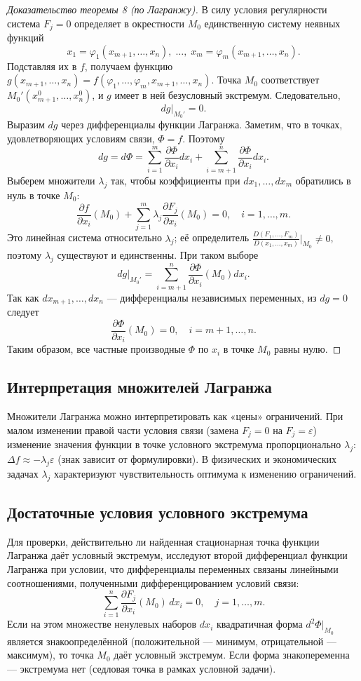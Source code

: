 \documentclass{article}
\theoremstyle{definition}
\begin{document}
\begin{proof}[Доказательство теоремы 8 (по Лагранжу)]
В силу условия регулярности система $F_j=0$ определяет в окрестности $M_0$ единственную систему неявных функций
\[
x_1=\varphi_1(x_{m+1},\dots,x_n),\;\dots,\;x_m=\varphi_m(x_{m+1},\dots,x_n).
\]
Подставляя их в $f$, получаем функцию $g(x_{m+1},\dots,x_n)=f(\varphi_1,\dots,\varphi_m,x_{m+1},\dots,x_n)$. Точка $M_0$ соответствует $M_0'(x_{m+1}^0,\dots,x_n^0)$, и $g$ имеет в ней безусловный экстремум. Следовательно,
\[
dg|_{M_0'}=0.
\]
Выразим $dg$ через дифференциалы функции Лагранжа. Заметим, что в точках, удовлетворяющих условиям связи, $\Phi=f$. Поэтому
\[
dg = d\Phi = \sum_{i=1}^m\frac{\partial\Phi}{\partial x_i}dx_i+\sum_{i=m+1}^n\frac{\partial\Phi}{\partial x_i}dx_i.
\]
Выберем множители $\lambda_j$ так, чтобы коэффициенты при $dx_1,\dots,dx_m$ обратились в нуль в точке $M_0$:
\[
\frac{\partial f}{\partial x_i}(M_0)+\sum_{j=1}^m\lambda_j\frac{\partial F_j}{\partial x_i}(M_0)=0,\quad i=1,\dots,m.
\]
Это линейная система относительно $\lambda_j$; её определитель $\frac{D(F_1,\dots,F_m)}{D(x_1,\dots,x_m)}\big|_{M_0}\neq0$, поэтому $\lambda_j$ существуют и единственны. При таком выборе
\[
dg|_{M_0'}= \sum_{i=m+1}^n\frac{\partial\Phi}{\partial x_i}(M_0)dx_i.
\]
Так как $dx_{m+1},\dots,dx_n$ — дифференциалы независимых переменных, из $dg=0$ следует
\[
\frac{\partial\Phi}{\partial x_i}(M_0)=0,\quad i=m+1,\dots,n.
\]
Таким образом, все частные производные $\Phi$ по $x_i$ в точке $M_0$ равны нулю.
\end{proof}

\subsection{Интерпретация множителей Лагранжа}
Множители Лагранжа можно интерпретировать как «цены» ограничений. При малом изменении правой части условия связи (замена $F_j=0$ на $F_j=\varepsilon$) изменение значения функции в точке условного экстремума пропорционально $\lambda_j$: $\Delta f\approx -\lambda_j\varepsilon$ (знак зависит от формулировки). В физических и экономических задачах $\lambda_j$ характеризуют чувствительность оптимума к изменению ограничений.

\subsection{Достаточные условия условного экстремума}
Для проверки, действительно ли найденная стационарная точка функции Лагранжа даёт условный экстремум, исследуют второй дифференциал функции Лагранжа при условии, что дифференциалы переменных связаны линейными соотношениями, полученными дифференцированием условий связи:
\[
\sum_{i=1}^n \frac{\partial F_j}{\partial x_i}(M_0)\,dx_i=0,\quad j=1,\dots,m.
\]
Если на этом множестве ненулевых наборов $dx_i$ квадратичная форма $d^2\Phi|_{M_0}$ является знакоопределённой (положительной — минимум, отрицательной — максимум), то точка $M_0$ даёт условный экстремум. Если форма знакопеременна — экстремума нет (седловая точка в рамках условной задачи).
\end{document}
